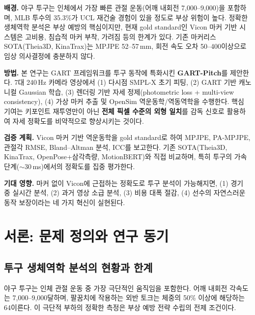\documentclass[11pt, a4paper]{report}
\begin{document}
\vspace{0.5cm}

\noindent\textbf{배경.} 야구 투구는 인체에서 가장 빠른 관절 운동(어깨 내회전 7,000--9,000\degps)을 포함하며,
MLB 투수의 35.3\%가 UCL 재건술 경험이 있을 정도로 부상 위험이 높다.
정확한 생체역학 분석은 부상 예방의 핵심이지만,
현재 gold standard인 Vicon 마커 기반 시스템은 고비용, 침습적 마커 부착, 가려짐 등의 한계가 있다.
기존 마커리스 SOTA(Theia3D, KinaTrax)는 MPJPE 52--57\,mm, 회전 속도 오차 50--400\degps 이상으로
임상 의사결정에 충분하지 않다.

\vspace{0.3cm}
\noindent\textbf{방법.} 본 연구는 GART 프레임워크를 투구 동작에 특화시킨 \textbf{GART-Pitch}를 제안한다.
7대 240\,Hz 카메라 영상에서 (1) 다시점 SMPL-X 초기 피팅, (2) GART 기반 캐노니컬 Gaussian 학습,
(3) 렌더링 기반 자세 정제(photometric loss + multi-view consistency),
(4) 가상 마커 추출 및 OpenSim 역운동학/역동역학을 수행한다.
핵심 기여는 키포인트 재투영만이 아닌 \textbf{전체 픽셀 수준의 외형 일치}를 감독 신호로 활용하여
자세 정확도를 비약적으로 향상시키는 것이다.

\vspace{0.3cm}
\noindent\textbf{검증 계획.}
Vicon 마커 기반 역운동학을 gold standard로 하여 MPJPE, PA-MPJPE, 관절각 RMSE,
Bland--Altman 분석, ICC를 보고한다.
기존 SOTA(Theia3D, KinaTrax, OpenPose+삼각측량, MotionBERT)와 직접 비교하며,
특히 투구의 가속 단계($\sim$30\,ms)에서의 정확도를 집중 평가한다.

\vspace{0.3cm}
\noindent\textbf{기대 영향.}
마커 없이 Vicon에 근접하는 정확도로 투구 분석이 가능해지면,
(1) 경기 중 실시간 분석, (2) 과거 영상 소급 분석, (3) 비용 대폭 절감,
(4) 선수의 자연스러운 동작 보장이라는 네 가지 혁신이 실현된다.


\chapter{서론: 문제 정의와 연구 동기}
\label{ch:introduction}

\section{투구 생체역학 분석의 현황과 한계}

야구 투구는 인체 관절 운동 중 가장 극단적인 움직임을 포함한다.
어깨 내회전 각속도는 7,000--9,000 달하며,
팔꿈치에 작용하는 외반 토크는 체중의 50\% 이상에 해당하는 64 이른다.
이 극단적 부하의 정확한 측정은 부상 예방 전략 수립의 전제 조건이다.
\end{document}
